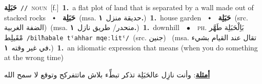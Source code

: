 \documentclass[10pt,a4paper,twoside]{article} %
\begin{document}
\begin{multicols}{2}
{{{{{{{\setlength\topsep{0pt}\textbf{\foreignlanguage{arabic}{حَبَلِة}}\ {\color{gray}\texttt{//}\color{black}}\ \textsc{noun}\ [f.]\ \textbf{1.}~a flat plot of land that is separated by a wall made out of stacked rocks\ \ $\smblkdiamond$\ \ \setlength\topsep{0pt}\textbf{\foreignlanguage{arabic}{حَبَلِة}}\ \color{gray}(msa. \foreignlanguage{arabic}{حديقة منزل}~\foreignlanguage{arabic}{\textbf{١.}})\color{black}\ \textbf{1.}~house garden\ \ $\smblkdiamond$\ \ \setlength\topsep{0pt}\textbf{\foreignlanguage{arabic}{حَبَلِة}}\ (src. \color{gray}\foreignlanguage{arabic}{الضفة الغربية}\color{black})\ \color{gray}(msa. \foreignlanguage{arabic}{منحدر/ طريق نازل}~\foreignlanguage{arabic}{\textbf{١.}})\color{black}\ \textbf{1.}~downhill\ \ $\bullet$\ \ \textsc{ph.} \color{gray} \foreignlanguage{arabic}{بَاِلْحَبَلِة طَهَّر مْقَيلِط}\color{black}\ {\color{gray}\texttt{/{\sffamily bilħabale tˤahhar mqeːlitˤ}/}\color{black}}\ \color{gray}(src. \foreignlanguage{arabic}{جنين})\color{black}\ \color{gray} (msa. \foreignlanguage{arabic}{تقال عند القيام بشيء في غير وقته}~\foreignlanguage{arabic}{\textbf{١.}})\color{black}\ \textbf{1.}~an idiomatic expression that means (when you do something at the wrong time)\  \begin{flushright}\color{gray}\foreignlanguage{arabic}{\textbf{\underline{\foreignlanguage{arabic}{أمثلة}}}: وأنت نازِل عالحَبَلِة تذكر تبطِّء بلاش ماتتفركح وتوقع لا سمح الله}\end{flushright}\color{black}} \vspace{2mm}

}}}}}}
\end{multicols}
\end{document}
